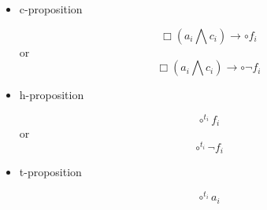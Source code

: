 \begin{itemize}
  \item c-proposition

  $$\Box(a_i\bigwedge c_i)\rightarrow \circ f_i$$ or $$\Box(a_i\bigwedge c_i)\rightarrow \circ \neg f_i$$
  \item h-proposition

  $$\circ^{t_i}f_i$$ or $$\circ^{t_i} \neg f_i$$
  \item t-proposition

  $$\circ^{t_i}a_i$$
\end{itemize}

\iffalse

\subsection{Naive approach from iterative}

To make the translation, we need to start from a domain langage for wich $\Pi$ is a discrete set of timepoint, and $\preceq$ is a total ordering of $\Pi$. On top of that, $\Pi$ need a timepoint $T_0$ such as $\forall T_i \in \Pi, T_0\preceq T_i$.

\subsubsection{Propositions}

\begin{itemize}
  \item c-proposition

  $$\Box(A_i\bigwedge C_i)\rightarrow \circ F_i$$ or $$\Box(A_i\bigwedge C_i)\rightarrow \circ \neg F_i$$
  \item h-proposition

  $$\circ^{T_i}F_i$$ or $$\circ^{T_i} \neg F_i$$
  \item t-proposition

  $$\circ^{T_i}A_i$$
\end{itemize}

\fi

